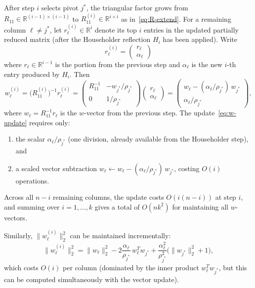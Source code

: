\documentclass[11pt]{article}
\theoremstyle{definition}
\theoremstyle{remark}
\newcommand{\R}{\mathbb{R}}
\newcommand{\tnorm}[1]{\lVert #1 \rVert_2}
\begin{document}
After step $i$ selects pivot $j^*$, the triangular factor grows
from $R_{11} \in \R^{(i-1)\times(i-1)}$ to $R_{11}^{(i)} \in
\R^{i \times i}$ as in~\eqref{eq:R-extend}.  For a remaining column
$\ell \neq j^*$, let $r_\ell^{(i)} \in \R^{i}$ denote its top $i$
entries in the updated partially reduced matrix (after the Householder
reflection $H_i$ has been applied).  Write
\[
  r_\ell^{(i)}
  = \begin{pmatrix} r_\ell \\ \alpha_\ell \end{pmatrix}
\]
where $r_\ell \in \R^{i-1}$ is the portion from the previous step and
$\alpha_\ell$ is the new $i$-th entry produced by $H_i$.  Then
\begin{equation}\label{eq:w-update}
  w_\ell^{(i)}
  = \bigl(R_{11}^{(i)}\bigr)^{-1} r_\ell^{(i)}
  = \begin{pmatrix} R_{11}^{-1} & -w_{j^*}/\rho_{j^*} \\
                     0 & 1/\rho_{j^*} \end{pmatrix}
    \begin{pmatrix} r_\ell \\ \alpha_\ell \end{pmatrix}
  = \begin{pmatrix} w_\ell - (\alpha_\ell / \rho_{j^*})\, w_{j^*} \\
                     \alpha_\ell / \rho_{j^*} \end{pmatrix},
\end{equation}
where $w_\ell = R_{11}^{-1} r_\ell$ is the $w$-vector from the
previous step.  The update~\eqref{eq:w-update} requires only:
\begin{enumerate}
\item the scalar $\alpha_\ell / \rho_{j^*}$ (one division, already
  available from the Householder step), and
\item a scaled vector subtraction $w_\ell \leftarrow w_\ell -
  (\alpha_\ell/\rho_{j^*})\,w_{j^*}$, costing $O(i)$ operations.
\end{enumerate}
Across all $n - i$ remaining columns, the update costs $O(i(n-i))$ at
step $i$, and summing over $i = 1, \ldots, k$ gives a total of
$O(nk^2)$ for maintaining all $w$-vectors.

Similarly, $\tnorm{w_\ell^{(i)}}^2$ can be maintained incrementally:
\begin{equation}\label{eq:wnorm-update}
  \tnorm{w_\ell^{(i)}}^2
  = \tnorm{w_\ell}^2
    - 2\frac{\alpha_\ell}{\rho_{j^*}}\, w_\ell^T w_{j^*}
    + \frac{\alpha_\ell^2}{\rho_{j^*}^2}\bigl(\tnorm{w_{j^*}}^2 + 1\bigr),
\end{equation}
which costs $O(i)$ per column (dominated by the inner product
$w_\ell^T w_{j^*}$, but this can be computed simultaneously with the
vector update).
\end{document}
